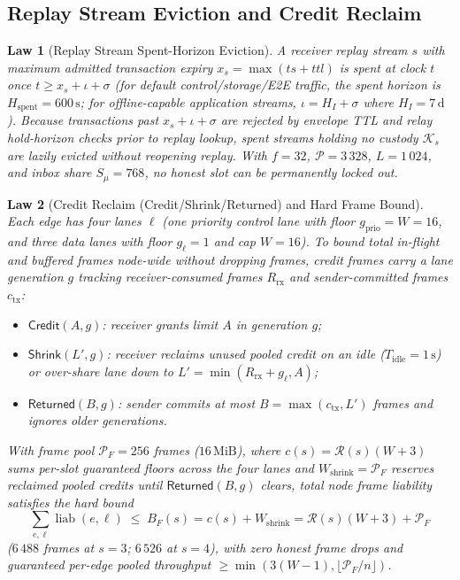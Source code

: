 \documentclass[journal]{IEEEtran}
\newtheorem{law}{Law}
\DeclareRobustCommand{\code}[1]{{\ttfamily\renewcommand{\_}{\textunderscore\allowbreak}#1}}
\begin{document}
\subsection{Replay Stream Eviction and Credit Reclaim}

\begin{law}[Replay Stream Spent-Horizon Eviction]\label{law:replay-eviction}
A receiver replay stream $s$ with maximum admitted transaction expiry
$x_s=\max(\mathit{ts}+\mathit{ttl})$ is \emph{spent} at clock $t$ once
$t\ge x_s+\iota+\sigma$ (for default control/storage/E2E traffic, the spent
horizon is $H_{\text{spent}}=600\,\mathrm{s}$; for offline-capable application
streams, $\iota=H_I+\sigma$ where $H_I=7\,\mathrm{d}$).  Because transactions past
$x_s+\iota+\sigma$ are rejected by envelope TTL and relay hold-horizon checks
prior to replay lookup, spent streams holding no custody $\mathcal{K}_s$ are
lazily evicted without reopening replay.  With $f=32$, $\mathcal{P}=3\,328$,
$L=1\,024$, and inbox share $S_\mu=768$, no honest slot can be permanently
locked out.
\end{law}

\begin{law}[Credit Reclaim (\code{Credit/Shrink/Returned}) and Hard Frame Bound]\label{law:credit-reclaim}
Each edge has four lanes $\ell$ (one priority control lane with floor
$g_{\mathrm{prio}}=W=16$, and three data lanes with floor $g_\ell=1$ and cap $W=16$).
To bound total in-flight and buffered frames node-wide without dropping frames,
credit frames carry a lane generation $g$ tracking receiver-consumed frames $R_{\mathrm{rx}}$
and sender-committed frames $c_{\mathrm{tx}}$:
\begin{itemize}[leftmargin=1.5em]
\item $\mathsf{Credit}(A,g)$: receiver grants limit $A$ in generation $g$;
\item $\mathsf{Shrink}(L',g)$: receiver reclaims unused pooled credit on an idle
($T_{\mathrm{idle}}=1\,\mathrm{s}$) or over-share lane down to $L'=\min(R_{\mathrm{rx}}+g_\ell,A)$;
\item $\mathsf{Returned}(B,g)$: sender commits at most $B=\max(c_{\mathrm{tx}},L')$ frames and
ignores older generations.
\end{itemize}
With frame pool $\mathcal{P}_F=256$ frames ($16\,\mathrm{MiB}$), where
$c(s)=\mathcal{R}(s)(W+3)$ sums per-slot guaranteed floors across the four lanes and
$W_{\text{shrink}}=\mathcal{P}_F$ reserves reclaimed pooled credits until $\mathsf{Returned}(B,g)$ clears,
total node frame liability satisfies the hard bound
\[
  \sum_{e,\ell}\operatorname{liab}(e,\ell)\;\le\;
  B_F(s)=c(s)+W_{\text{shrink}}=\mathcal{R}(s)(W+3)+\mathcal{P}_F
\]
($6\,488$ frames at $s=3$; $6\,526$ at $s=4$), with zero honest frame drops and
guaranteed per-edge pooled throughput $\ge\min(3(W-1),\lfloor\mathcal{P}_F/n\rfloor)$.
\end{law}
\end{document}
